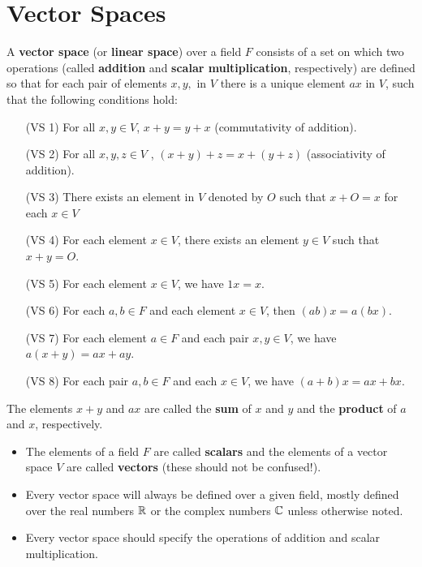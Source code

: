 
\section{Vector Spaces}

\begin{definition}{}{}
    A \textbf{vector space} (or \textbf{linear space}) over a field \( F \) consists of a set on which two operations (called \textbf{addition} and \textbf{scalar multiplication}, respectively) are defined so that for each pair of elements \( x,y, \) in \( V \) there is a unique element \( ax  \) in \( V  \), such that the following conditions hold:
    \begin{enumerate}
        \item[(VS 1)] For all \( x,y   \in V \), \( x + y = y + x  \) (commutativity of addition).
        \item[(VS 2)] For all \( x, y, z  \in V  \) , \( (x+y) + z = x + (y + z)  \) (associativity of addition).
        \item[(VS 3)] There exists an element in \( V  \) denoted by \( O  \) such that \( x + O = x  \) for each \( x  \in V \) 
        \item[(VS 4)] For each element \( x \in V  \), there exists an element \( y \in V  \) such that \( x + y = O \).
        \item[(VS 5)] For each element \( x \in V  \), we have \( 1x = x  \).
        \item[(VS 6)] For each \( a,b \in F  \) and each element \( x \in V  \), then \( (ab)x = a(bx) \). 
        \item[(VS 7)] For each element \( a \in F  \) and each pair \( x,y \in V  \), we have \( a(x+y) = ax + ay \).
        \item[(VS 8)]  For each pair \( a,b \in F  \) and each \( x \in V  \), we have \( (a+b)x = ax + bx \).
    \end{enumerate} 
The elements \( x + y  \) and \( a x  \) are called the \textbf{sum} of \( x  \) and \( y  \) and the \textbf{product} of \( a  \) and \( x  \), respectively.
\end{definition}

\begin{itemize}
    \item The elements of a field \( F  \) are called \textbf{scalars} and the elements of a vector space \( V  \) are called \textbf{vectors} (these should not be confused!).
    \item Every vector space will always be defined over a given field, mostly defined over the real numbers \( \mathbb{R}  \) or the complex numbers \( \mathbb{C}  \) unless otherwise noted.
    \item Every vector space should specify the operations of addition and scalar multiplication.
\end{itemize}

